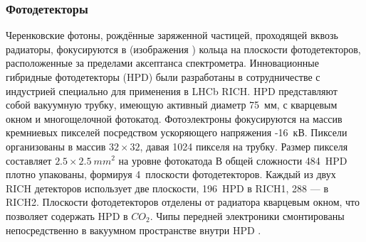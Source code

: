 

\todo



\subsubsection{Фотодетекторы}

Черенковские фотоны, рождённые заряженной частицей, проходящей вквозь радиаторы, фокусируются в (изображения \todo) кольца на плоскости фотодетекторов, расположенные за пределами аксептанса спектрометра. Инновационные гибридные фотодетекторы (HPD) были разработаны в сотрудничестве с индустрией специально для применения в LHCb RICH. HPD представляют собой вакуумную трубку, имеющую активный диаметр 75~мм, с кварцевым окном и многощелочной фотокатод. Фотоэлектроны фокусируются на массив кремниевых пикселей посредством ускоряющего напряжения -16~кВ. Пиксели организованы в массив $32 \times 32$, давая 1024 пикселя на трубку. Размер пикселя составляет $2.5 \times 2.5~mm^{2}$ на уровне фотокатода \todo В общей сложности 484~HPD плотно упакованы, формируя 4~плоскости фотодетекторов. Каждый из двух RICH детекторов использует две плоскости, 196~HPD в RICH1, 288 --- в RICH2.
Плоскости фотодетекторов отделены от радиатора кварцевым окном, что позволяет содержать HPD в $CO_{2}$. Чипы передней электроники смонтированы непосредственно в вакуумном пространстве внутри HPD \todo.

